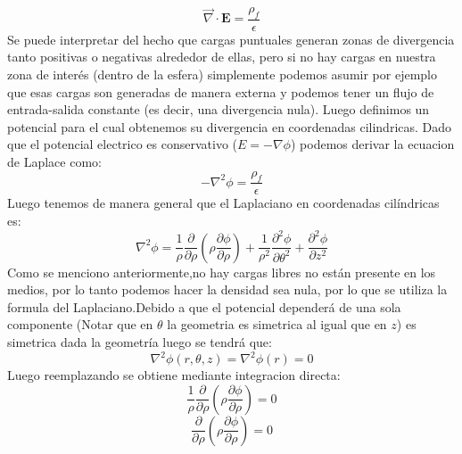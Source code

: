 \documentclass[
  11pt,
  letterpaper,
   addpoints,
  ]{exam}
\begin{document}
\begin{questions}
\begin{solution}
\begin{enumerate}
            \begin{equation}
                \Vec{\nabla} \cdot \textbf{E} = \frac{\rho_f}{\epsilon} 
            \end{equation}
            Se puede interpretar del hecho que cargas puntuales generan zonas de divergencia tanto positivas o negativas alrededor de ellas, pero si no hay cargas en nuestra zona de interés (dentro de la esfera) simplemente podemos asumir por ejemplo que esas cargas son generadas de manera externa y podemos tener un flujo de entrada-salida constante (es decir, una divergencia nula). Luego definimos un potencial para el cual obtenemos su divergencia en coordenadas cilindricas. Dado que el potencial electrico es conservativo ($E = - \nabla \phi$) podemos derivar la ecuacion de Laplace como:
            \begin{equation}
                -\nabla^{2}\phi = \frac{\rho_f}{\epsilon}
            \end{equation}
            Luego tenemos de manera general que el Laplaciano en coordenadas cilíndricas es:
            \begin{equation}
                \nabla^{2}\phi = \frac{1}{\rho} \frac{\partial}{\partial\rho}\left(\rho \frac{\partial\phi}{\partial \rho}\right) + \frac{1}{\rho^{2}}\frac{\partial^{2}\phi}{\partial\theta^{2}} + \frac{\partial^{2}\phi}{\partial z^{2}}
            \end{equation}
            Como se menciono anteriormente,no hay cargas libres no están presente en los medios, por lo tanto podemos hacer la densidad sea nula, por lo que se utiliza la formula del Laplaciano.Debido a que el potencial dependerá de una sola componente (Notar que en $\theta$ la geometria es simetrica al igual que en $z$) es simetrica dada la geometría luego se tendrá que:
            \begin{equation}
                \nabla^{2}\phi(r,\theta, z) =  \nabla^{2}\phi(r)=0
            \end{equation}            
            Luego reemplazando se obtiene mediante integracion directa:
            \begin{equation}
                \frac{1}{\rho} \frac{\partial}{\partial\rho}\left(\rho \frac{\partial \phi}{\partial \rho}\right) = 0
            \end{equation}
            \begin{equation}
                \frac{\partial}{\partial\rho}\left(\rho \frac{\partial \phi}{\partial \rho}\right) = 0
            \end{equation}

\end{enumerate}
\end{solution}
\end{questions}
\end{document}

